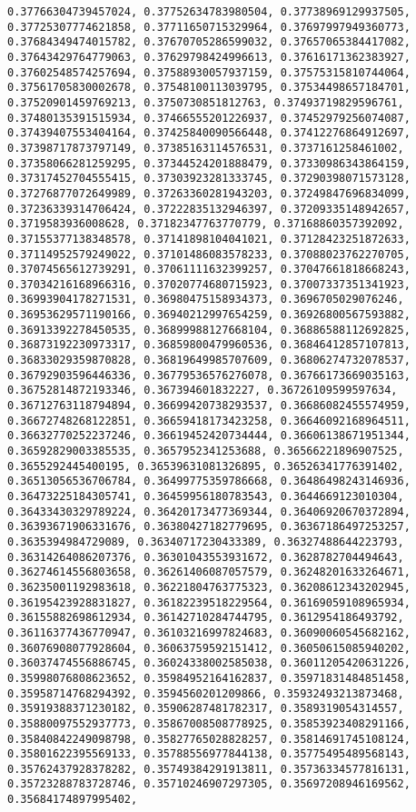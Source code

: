 \documentclass[11pt]{article}
\begin{document}
\begin{Verbatim}[commandchars=\\\{\}]
0.37766304739457024, 0.37752634783980504, 0.37738969129937505, 0.37725307774621858, 0.37711650715329964, 0.37697997949360773, 0.37684349474015782, 0.37670705286599032, 0.37657065384417082, 0.37643429764779063, 0.37629798424996613, 0.37616171362383927, 0.37602548574257694, 0.37588930057937159, 0.37575315810744064, 0.37561705830002678, 0.37548100113039795, 0.37534498657184701, 0.37520901459769213, 0.3750730851812763, 0.37493719829596761, 0.37480135391515934, 0.37466555201226937, 0.37452979256074087, 0.37439407553404164, 0.37425840090566448, 0.37412276864912697, 0.37398717873797149, 0.37385163114576531, 0.3737161258461002, 0.37358066281259295, 0.37344524201888479, 0.37330986343864159, 0.37317452704555415, 0.37303923281333745, 0.37290398071573128, 0.37276877072649989, 0.37263360281943203, 0.37249847696834099, 0.37236339314706424, 0.37222835132946397, 0.37209335148942657, 0.3719583936008628, 0.37182347763770779, 0.37168860357392092, 0.37155377138348578, 0.37141898104041021, 0.37128423251872633, 0.37114952579249022, 0.37101486083578233, 0.37088023762270705, 0.37074565612739291, 0.37061111632399257, 0.37047661818668243, 0.37034216168966316, 0.37020774680715923, 0.37007337351341923, 0.36993904178271531, 0.36980475158934373, 0.3696705029076246, 0.36953629571190166, 0.36940212997654259, 0.36926800567593882, 0.36913392278450535, 0.36899988127668104, 0.36886588112692825, 0.36873192230973317, 0.36859800479960536, 0.36846412857107813, 0.36833029359870828, 0.36819649985707609, 0.36806274732078537, 0.36792903596446336, 0.36779536576276078, 0.36766173669035163, 0.36752814872193346, 0.367394601832227, 0.36726109599597634, 0.36712763118794894, 0.36699420738293537, 0.36686082455574959, 0.36672748268122851, 0.36659418173423258, 0.36646092168964511, 0.36632770252237246, 0.36619452420734444, 0.36606138671951344, 0.36592829003385535, 0.3657952341253688, 0.36566221896907525, 0.3655292445400195, 0.36539631081326895, 0.36526341776391402, 0.36513056536706784, 0.36499775359786668, 0.36486498243146936, 0.36473225184305741, 0.36459956180783543, 0.3644669123010304, 0.36433430329789224, 0.36420173477369344, 0.36406920670372894, 0.36393671906331676, 0.36380427182779695, 0.36367186497253257, 0.3635394984729089, 0.36340717230433389, 0.36327488644223793, 0.36314264086207376, 0.36301043553931672, 0.3628782704494643, 0.36274614556803658, 0.36261406087057579, 0.36248201633264671, 0.36235001192983618, 0.36221804763775323, 0.36208612343202945, 0.36195423928831827, 0.36182239518229564, 0.36169059108965934, 0.36155882698612934, 0.36142710284744795, 0.3612954186493792, 0.36116377436770947, 0.36103216997824683, 0.36090060545682162, 0.36076908077928604, 0.36063759592151412, 0.36050615085940202, 0.36037474556886745, 0.36024338002585038, 0.36011205420631226, 0.35998076808623652, 0.35984952164162837, 0.35971831484851458, 0.35958714768294392, 0.3594560201209866, 0.35932493213873468, 0.35919388371230182, 0.35906287481782317, 0.3589319054314557, 0.35880097552937773, 0.35867008508778925, 0.35853923408291166, 0.35840842249098798, 0.35827765028828257, 0.35814691745108124, 0.35801622395569133, 0.35788556977844138, 0.35775495489568143, 0.35762437928378282, 0.35749384291913811, 0.35736334577816131, 0.35723288783728746, 0.35710246907297305, 0.35697208946169562, 0.35684174897995402, 
\end{Verbatim}
\end{document}

